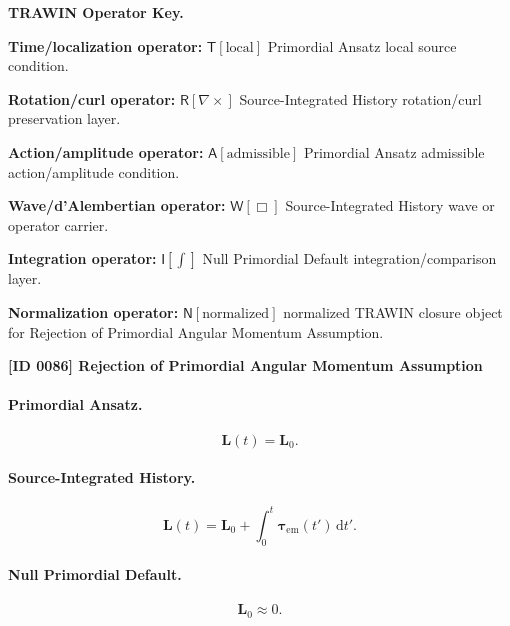 \par\vspace{0.45\baselineskip}
\noindent\begin{minipage}[t]{\linewidth}
\begingroup
\small
\raggedright
\textbf{TRAWIN Operator Key.}\par
\noindent\textbf{Time/localization operator:} $\mathsf{T}\!\left[\mathrm{local}\right]$ Primordial Ansatz local source condition.\par
\noindent\textbf{Rotation/curl operator:} $\mathsf{R}\!\left[\nabla\times\right]$ Source-Integrated History rotation/curl preservation layer.\par
\noindent\textbf{Action/amplitude operator:} $\mathsf{A}\!\left[\mathrm{admissible}\right]$ Primordial Ansatz admissible action/amplitude condition.\par
\noindent\textbf{Wave/d'Alembertian operator:} $\mathsf{W}\!\left[\Box\right]$ Source-Integrated History wave or operator carrier.\par
\noindent\textbf{Integration operator:} $\mathsf{I}\!\left[\int\right]$ Null Primordial Default integration/comparison layer.\par
\noindent\textbf{Normalization operator:} $\mathsf{N}\!\left[\mathrm{normalized}\right]$ normalized TRAWIN closure object for Rejection of Primordial Angular Momentum Assumption.\par
\endgroup
\end{minipage}

\clearpage
\noindent\textbf{[ID 0086] Rejection of Primordial Angular Momentum Assumption}\par
\vspace{0.35em}
\paragraph{Primordial Ansatz.}
\begin{equation}
\mathbf{L}(t)=\mathbf{L}_0 .
\end{equation}

\paragraph{Source-Integrated History.}
\begin{equation}
\mathbf{L}(t)
=
\mathbf{L}_0
+
\int_0^t
\boldsymbol{\tau}_{\mathrm{em}}(t')
\,\mathrm{d}t' .
\end{equation}

\paragraph{Null Primordial Default.}
\begin{equation}
\mathbf{L}_0\approx 0 .
\end{equation}

